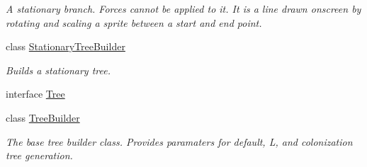\begin{DoxyCompactItemize}
\begin{DoxyCompactList}\small\item\em A stationary branch. Forces cannot be applied to it. It is a line drawn onscreen by rotating and scaling a sprite between a start and end point. \end{DoxyCompactList}\item 
class \hyperlink{class_fractal_tree_1_1_stationary_tree_builder}{Stationary\+Tree\+Builder}
\begin{DoxyCompactList}\small\item\em Builds a stationary tree. \end{DoxyCompactList}\item 
interface \hyperlink{interface_fractal_tree_1_1_tree}{Tree}
\item 
class \hyperlink{class_fractal_tree_1_1_tree_builder}{Tree\+Builder}
\begin{DoxyCompactList}\small\item\em The base tree builder class. Provides paramaters for default, L, and colonization tree generation. \end{DoxyCompactList}\end{DoxyCompactItemize}
